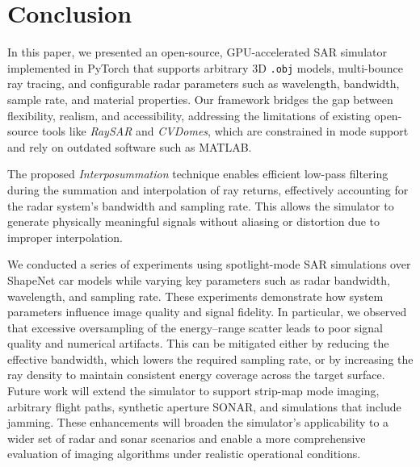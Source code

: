 \documentclass[onecolumn]{IEEEtran}
\begin{document}
\section{Conclusion}
\label{sec:conclusion}
In this paper, we presented an open-source, GPU-accelerated SAR simulator implemented in PyTorch that supports arbitrary 3D \texttt{.obj} models, multi-bounce ray tracing, and configurable radar parameters such as wavelength, bandwidth, sample rate, and material properties. Our framework bridges the gap between flexibility, realism, and accessibility, addressing the limitations of existing open-source tools like \emph{RaySAR} and \emph{CVDomes}, which are constrained in mode support and rely on outdated software such as MATLAB.

The proposed \emph{Interposummation} technique enables efficient low-pass filtering during the summation and interpolation of ray returns, effectively accounting for the radar system's bandwidth and sampling rate. This allows the simulator to generate physically meaningful signals without aliasing or distortion due to improper interpolation.

We conducted a series of experiments using spotlight-mode SAR simulations over ShapeNet car models while varying key parameters such as radar bandwidth, wavelength, and sampling rate. These experiments demonstrate how system parameters influence image quality and signal fidelity. In particular, we observed that excessive oversampling of the energy–range scatter leads to poor signal quality and numerical artifacts. This can be mitigated either by reducing the effective bandwidth, which lowers the required sampling rate, or by increasing the ray density to maintain consistent energy coverage across the target surface.
Future work will extend the simulator to support strip-map mode imaging, arbitrary flight paths, synthetic aperture SONAR, and simulations that include jamming. These enhancements will broaden the simulator's applicability to a wider set of radar and sonar scenarios and enable a more comprehensive evaluation of imaging algorithms under realistic operational conditions.




{\small


}
\end{document}
